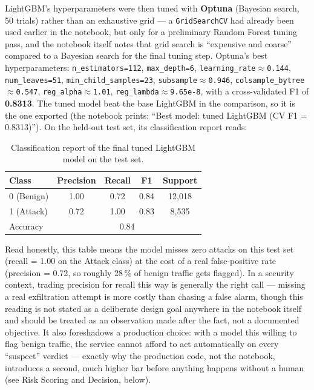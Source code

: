 LightGBM's hyperparameters were then tuned with \textbf{Optuna} (Bayesian
search, 50 trials) rather than an exhaustive grid --- a \texttt{GridSearchCV}
had already been used earlier in the notebook, but only for a preliminary
Random Forest tuning pass, and the notebook itself notes that grid search is
``expensive and coarse'' compared to a Bayesian search for the final tuning
step. Optuna's best hyperparameters: \texttt{n\_estimators=112},
\texttt{max\_depth=6}, \texttt{learning\_rate$\approx$0.144},
\texttt{num\_leaves=51}, \texttt{min\_child\_samples=23},
\texttt{subsample$\approx$0.946}, \texttt{colsample\_bytree$\approx$0.547},
\texttt{reg\_alpha$\approx$1.01}, \texttt{reg\_lambda$\approx$9.65e-8}, with
a cross-validated F1 of \textbf{0.8313}. The tuned model beat the base
LightGBM in the comparison, so it is the one exported (the notebook prints:
``Best model: tuned LightGBM (CV F1 = 0.8313)''). On the held-out test set,
its classification report reads:

\begin{table}[h]
\centering
\small
\begin{tabular}{@{}lcccc@{}}
\toprule
\textbf{Class} & \textbf{Precision} & \textbf{Recall} & \textbf{F1} & \textbf{Support} \\
\midrule
0 (Benign) & 1.00 & 0.72 & 0.84 & 12,018 \\
1 (Attack) & 0.72 & 1.00 & 0.83 & 8,535 \\
\midrule
Accuracy & \multicolumn{4}{c}{0.84} \\
\bottomrule
\end{tabular}
\caption{Classification report of the final tuned LightGBM model on the test set.}
\end{table}

Read honestly, this table means the model misses zero attacks on this test
set (recall = 1.00 on the Attack class) at the cost of a real false-positive
rate (precision = 0.72, so roughly 28\,\% of benign traffic gets flagged).
In a security context, trading precision for recall this way is generally
the right call --- missing a real exfiltration attempt is more costly than
chasing a false alarm, though this reading is not stated as a deliberate
design goal anywhere in the notebook itself and should be treated as an
observation made after the fact, not a documented objective. It also
foreshadows a production choice: with a model this willing to flag benign
traffic, the service cannot afford to act automatically on every
``suspect'' verdict --- exactly why the production code, not the notebook,
introduces a second, much higher bar before anything happens without a
human (see Risk Scoring and Decision, below).

